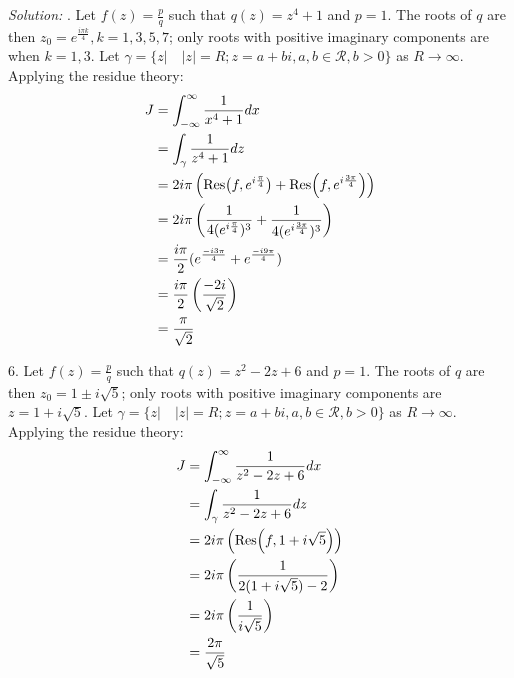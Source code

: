 \documentclass[11pt]{homework}
\begin{document}
\emph{Solution:}
. Let $f(z) = \frac{p}{q}$ such that $q(z) = z^4+1$ and $p = 1$.
The roots of $q$ are then $z_0 = e^{\frac{i\pi k}{4}}, k = 1, 3, 5, 7$;
only roots with positive imaginary components are when $k=1,3$.
Let $\gamma = \{z |\quad |z|=R; z=a+bi, a,b\in\mathcal{R}, b>0\}$ as $R \to \infty$.
Applying the residue theory:
\begin{align*}
J &= \int_{-\infty}^{\infty} \frac{1}{x^4+1} dx \\
  &= \int_{\gamma} \frac{1}{z^4+1} dz \\
  &= 2i\pi \left( \Res( f, e^{i\frac{\pi}{4}}) + \Res( f, e^{i\frac{3\pi}{4}}) \right) \\
  &= 2i\pi \left( \frac{1}{4(e^{i\frac{\pi}{4}})^3} + \frac{1}{4 (e^{i\frac{3\pi}{4}})^3} \right) \\
  &= \frac{i\pi }{2} ( e^{\frac{-i3\pi}{4}} + e^\frac{-i9\pi}{4}  ) \\
  &= \frac{i\pi}{2} \left( \frac{-2i}{\sqrt{2}} \right) \\
  &= \frac{\pi}{\sqrt{2}}
\end{align*}

6. Let $f(z) = \frac{p}{q}$ such that $q(z) = z^2-2z+6$ and $p = 1$.
The roots of $q$ are then $z_0 = 1\pm i \sqrt{5}$;
only roots with positive imaginary components are $z=1+i\sqrt{5}$.
Let $\gamma = \{z |\quad |z|=R; z=a+bi, a,b\in\mathcal{R}, b>0\}$ as $R \to \infty$.
Applying the residue theory:
\begin{align*}
J &= \int_{-\infty}^{\infty} \frac{1}{z^2-2z+6} dx \\
  &= \int_{\gamma} \frac{1}{z^2-2z+6} dz  \\
  &= 2i\pi \left( \Res( f, 1+i\sqrt{5}) \right) \\
  &= 2i\pi \left( \frac{1}{2(1+i\sqrt{5})-2} \right) \\
  &= 2i\pi \left( \frac{1}{i\sqrt{5}} \right) \\
  &= \frac{2\pi}{\sqrt{5}}
\end{align*}
\end{document}
